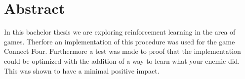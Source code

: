 \chapter{Abstract}
In this bachelor thesis we are exploring reinforcement learning in the area of games. Therfore an implementation of this procedure was used for the game Connect Four. Furthermore a test was made to proof that the implementation could be optimized with the addition of a way to learn what your enemie did. This was shown to have a minimal positive impact.

